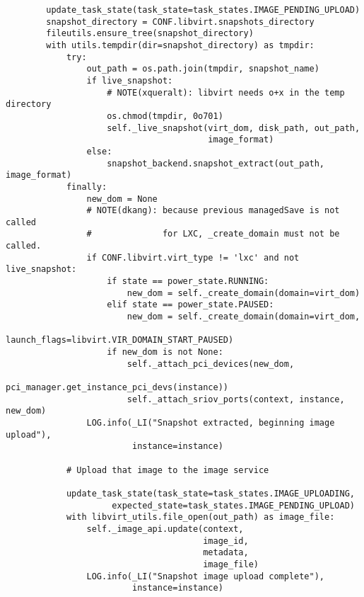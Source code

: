 \documentclass[a4paper,left=1.5cm,right=1.5cm,11pt]{article}
\begin{document}
\begin{lstlisting}
        update_task_state(task_state=task_states.IMAGE_PENDING_UPLOAD)
        snapshot_directory = CONF.libvirt.snapshots_directory
        fileutils.ensure_tree(snapshot_directory)
        with utils.tempdir(dir=snapshot_directory) as tmpdir:
            try:
                out_path = os.path.join(tmpdir, snapshot_name)
                if live_snapshot:
                    # NOTE(xqueralt): libvirt needs o+x in the temp directory
                    os.chmod(tmpdir, 0o701)
                    self._live_snapshot(virt_dom, disk_path, out_path,
                                        image_format)
                else:
                    snapshot_backend.snapshot_extract(out_path, image_format)
            finally:
                new_dom = None
                # NOTE(dkang): because previous managedSave is not called
                #              for LXC, _create_domain must not be called.
                if CONF.libvirt.virt_type != 'lxc' and not live_snapshot:
                    if state == power_state.RUNNING:
                        new_dom = self._create_domain(domain=virt_dom)
                    elif state == power_state.PAUSED:
                        new_dom = self._create_domain(domain=virt_dom,
                                launch_flags=libvirt.VIR_DOMAIN_START_PAUSED)
                    if new_dom is not None:
                        self._attach_pci_devices(new_dom,
                            pci_manager.get_instance_pci_devs(instance))
                        self._attach_sriov_ports(context, instance, new_dom)
                LOG.info(_LI("Snapshot extracted, beginning image upload"),
                         instance=instance)

            # Upload that image to the image service

            update_task_state(task_state=task_states.IMAGE_UPLOADING,
                     expected_state=task_states.IMAGE_PENDING_UPLOAD)
            with libvirt_utils.file_open(out_path) as image_file:
                self._image_api.update(context,
                                       image_id,
                                       metadata,
                                       image_file)
                LOG.info(_LI("Snapshot image upload complete"),
                         instance=instance)
    \end{lstlisting}
\end{document}
